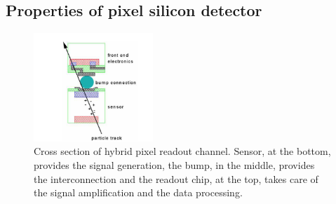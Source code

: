 
\subsection{Properties of pixel silicon detector}
\begin{figure}
\centering
\includegraphics[width=0.4\textwidth]{Images/tracking_det/hybrid.png}
\caption{Cross section of hybrid pixel readout channel. Sensor, at the bottom, provides the signal generation, the bump, in the middle, provides the interconnection and the readout chip, at the top, takes care of the signal amplification and the data processing.}
\end{figure}

